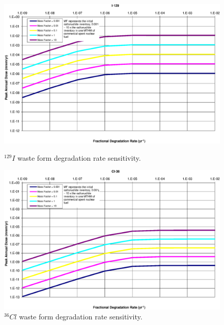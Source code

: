 \begin{figure}[ht!]
\begin{minipage}[b]{0.45\linewidth}
\centering
\includegraphics[width=\linewidth]{./results/images/WFDegAndInv/I-129.eps}
\caption{$^{129}I$ waste form degradation rate sensitivity.}
\label{fig:WFDegI129}

\end{minipage}
\hspace{0.05\linewidth}
\begin{minipage}[b]{0.45\linewidth}

\includegraphics[width=\linewidth]{./results/images/WFDegAndInv/Cl-36.eps}
\caption{$^{36}Cl$ waste form degradation rate sensitivity.}
\label{fig:WFDegCl36}
\end{minipage}
\end{figure}

\FloatBarrier
